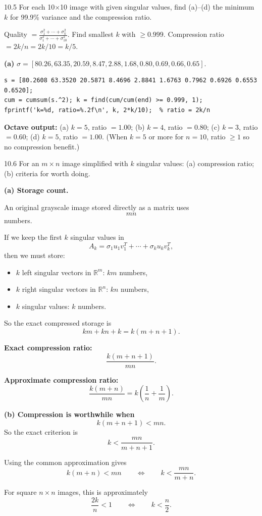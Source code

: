 \begin{exercise}{10.5}
For each 10$\times$10 image with given singular values, find (a)--(d) the minimum $k$ for 99.9\% variance and the compression ratio.
\end{exercise}
\begin{solution}
Quality $= \frac{\sigma_1^2+\cdots+\sigma_k^2}{\sigma_1^2+\cdots+\sigma_{10}^2}$. Find smallest $k$ with $\geq 0.999$. Compression ratio $= 2k/n = 2k/10 = k/5$.

\textbf{(a)} $\sigma = [80.26, 63.35, 20.59, 8.47, 2.88, 1.68, 0.80, 0.69, 0.66, 0.65]$.
\begin{lstlisting}
s = [80.2608 63.3520 20.5871 8.4696 2.8841 1.6763 0.7962 0.6926 0.6553 0.6520];
cum = cumsum(s.^2); k = find(cum/cum(end) >= 0.999, 1);
fprintf('k=%d, ratio=%.2f\n', k, 2*k/10);  % ratio = 2k/n
\end{lstlisting}
\textbf{Octave output:} (a) $k=5$, ratio $=1.00$; (b) $k=4$, ratio $=0.80$; (c) $k=3$, ratio $=0.60$; (d) $k=5$, ratio $=1.00$. (When $k=5$ or more for $n=10$, ratio $\geq 1$ so no compression benefit.)
\end{solution}

\begin{exercise}{10.6}
For an $m\times n$ image simplified with $k$ singular values: (a) compression ratio; (b) criteria for worth doing.
\end{exercise}
\begin{solution}
\textbf{(a) Storage count.}

An original grayscale image stored directly as a matrix uses
\[
mn
\]
numbers.

If we keep the first $k$ singular values in
\[
A_k=\sigma_1u_1v_1^T+\cdots+\sigma_ku_kv_k^T,
\]
then we must store:
\begin{itemize}
  \item $k$ left singular vectors in $\mathbb{R}^m$: $km$ numbers,
  \item $k$ right singular vectors in $\mathbb{R}^n$: $kn$ numbers,
  \item $k$ singular values: $k$ numbers.
\end{itemize}
So the exact compressed storage is
\[
km+kn+k = k(m+n+1).
\]

\textbf{Exact compression ratio:}
\[
\boxed{\frac{k(m+n+1)}{mn}.}
\]

\textbf{Approximate compression ratio:}
\[
\boxed{\frac{k(m+n)}{mn} = k\left(\frac{1}{n}+\frac{1}{m}\right).}
\]

\textbf{(b) Compression is worthwhile when}
\[
k(m+n+1)<mn.
\]
So the exact criterion is
\[
\boxed{k<\frac{mn}{m+n+1}.}
\]

Using the common approximation gives
\[
k(m+n)<mn
\qquad\Longleftrightarrow\qquad
\boxed{k<\frac{mn}{m+n}.}
\]

For square $n\times n$ images, this is approximately
\[
\frac{2k}{n}<1
\qquad\Longleftrightarrow\qquad
k<\frac{n}{2}.
\]
\end{solution}
